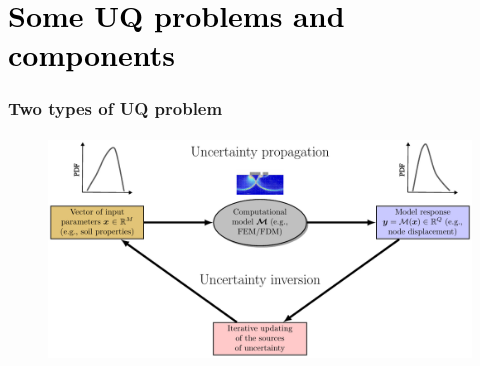 
\section{\textcolor{black}{Some UQ problems and components}}
\begin{frame}
	\frametitle{Two types of UQ problem}
	\framesubtitle{} %
        \begin{figure}
            \includegraphics[scale=0.7]{figures/figure-UQ_steps.pdf}
        \end{figure}
\end{frame}


